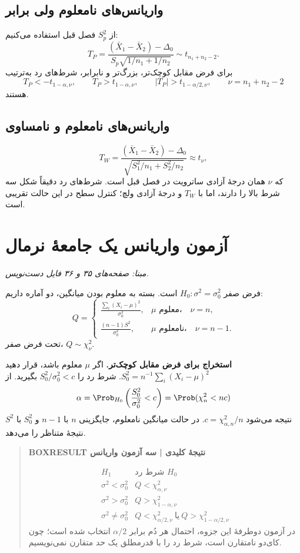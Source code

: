 \subsection{واریانس‌های نامعلوم ولی برابر}
از $S_p^2$ فصل قبل استفاده می‌کنیم:
\[
T_P=\frac{(\bar X_1-\bar X_2)-\Delta_0}
{S_p\sqrt{1/n_1+1/n_2}}\sim t_{n_1+n_2-2}.
\]
برای فرض مقابل کوچک‌تر، بزرگ‌تر و نابرابر، شرط‌های رد به‌ترتیب
\[
T_P<-t_{1-\alpha,\nu},\qquad
T_P>t_{1-\alpha,\nu},\qquad
|T_P|>t_{1-\alpha/2,\nu},\qquad \nu=n_1+n_2-2
\]
هستند.
\subsection{واریانس‌های نامعلوم و نامساوی}
\[
T_W=\frac{(\bar X_1-\bar X_2)-\Delta_0}
{\sqrt{S_1^2/n_1+S_2^2/n_2}}\approx t_\nu,
\]
که $\nu$ همان درجهٔ آزادی ساترویت در فصل قبل است. شرط‌های رد دقیقاً شکل سه شرط بالا را دارند، اما با $T_W$ و درجهٔ آزادی ولچ؛ کنترل سطح در این حالت تقریبی است.
\section{آزمون واریانس یک جامعهٔ نرمال}
\textit{مبنا: صفحه‌های ۳۵ و ۳۶ فایل دست‌نویس.}\par 
فرض صفر $H_0:\sigma^2=\sigma_0^2$ است. بسته به معلوم بودن میانگین، دو آماره داریم:
\[
Q=\begin{cases}
\displaystyle\frac{\sum_i(X_i-\mu)^2}{\sigma_0^2},&\mu\text{ معلوم،}\quad\nu=n,\\[5pt]
\displaystyle\frac{(n-1)S^2}{\sigma_0^2},&\mu\text{ نامعلوم،}\quad\nu=n-1.
\end{cases}
\]
تحت فرض صفر، $Q\sim\chi^2_\nu$.

\textbf{استخراج برای فرض مقابل کوچک‌تر.} اگر $\mu$ معلوم باشد، قرار دهید $S_0^2=n^{-1}\sum_i(X_i-\mu)^2$. شرط رد را $S_0^2/\sigma_0^2<c$ بگیرید. از
\[
\alpha=\Prob_{H_0}\left(\frac{S_0^2}{\sigma_0^2}<c\right)
=\Prob(\chi^2_n<nc)
\]
نتیجه می‌شود $c=\chi^2_{\alpha,n}/n$. در حالت میانگین نامعلوم، جایگزینی $n$ با $n-1$ و $S_0^2$ با $S^2$ نتیجهٔ متناظر را می‌دهد.
\begin{quote}\textbf{BOXRESULT نتیجهٔ کلیدی | سه آزمون واریانس}\par 
\[
\begin{array}{c|c}
H_1&\text{شرط رد }H_0\\\hline
\sigma^2<\sigma_0^2&Q<\chi^2_{\alpha,\nu}\\[2pt]
\sigma^2>\sigma_0^2&Q>\chi^2_{1-\alpha,\nu}\\[2pt]
\sigma^2\ne\sigma_0^2&Q<\chi^2_{\alpha/2,\nu}\ \text{یا}\ Q>\chi^2_{1-\alpha/2,\nu}
\end{array}
\]
در آزمون دوطرفهٔ این جزوه، احتمال هر دُم برابر $\alpha/2$ انتخاب شده است؛ چون کای‌دو نامتقارن است، شرط رد را با قدرمطلق یک حد متقارن نمی‌نویسیم.
\end{quote}
